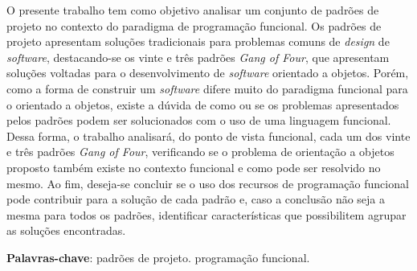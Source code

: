 \setlength{\absparsep}{18pt} %
\begin{resumo}
  O presente trabalho tem como objetivo analisar 
  um conjunto de padrões de projeto no contexto do 
  paradigma de programação funcional. Os padrões 
  de projeto apresentam soluções tradicionais para problemas 
  comuns de \textit{design} de \textit{software}, 
  destacando-se os vinte e três padrões 
  \textit{Gang of Four}, que apresentam soluções 
  voltadas para o desenvolvimento de \textit{software} 
  orientado a objetos. Porém, como a forma 
  de construir um \textit{software} difere muito 
  do paradigma funcional para o orientado a 
  objetos, existe a dúvida de como ou se os 
  problemas apresentados pelos padrões podem ser 
  solucionados com o uso de uma linguagem 
  funcional. Dessa forma, o trabalho analisará, 
  do ponto de vista funcional, cada um dos 
  vinte e três padrões \textit{Gang of Four}, 
  verificando se o problema de orientação a objetos 
  proposto também existe no contexto funcional e 
  como pode ser resolvido no mesmo. Ao 
  fim, deseja-se concluir se o uso dos recursos de 
  programação funcional pode contribuir para a 
  solução de cada padrão e, caso a conclusão não 
  seja a mesma para todos os padrões, 
  identificar características que possibilitem 
  agrupar as soluções encontradas.

 \textbf{Palavras-chave}: padrões de projeto. programação funcional.
\end{resumo}

\begin{comment}
  O presente trabalho tem como objetivo analisar 
  o conceito de padrões de projeto no contexto do 
  paradigma de programação funcional. Os padrões 
  de projeto apresentam soluções comuns para problemas 
  comuns de design de software, destacando-se os 
  vinte e três padrões Gang of Four, que apresentam 
  soluções comuns para problemas relacionados ao 
  paradigma orientado a objetos. Porém, como a forma 
  de construir um software difere muito do paradigma 
  funcional para o orientado a 
  objetos, existe a dúvida de como ou se esses padrões 
  podem ser reaproveitados, além da possibilidade de o 
  uso do paradigma funcional solucionar os problemas 
  oriundos da orientação a objetos.
  Dessa forma, o trabalho buscará analisar, 
  do ponto de vista funcional, cada um dos 
  23 padrões GoF, verificando se o problema de 
  orientação a objetos proposto também existe 
  no contexto funcional e se é resolvido pelo 
  padrão em questão. Também serão analisados, se 
  existirem, os casos em que o problema deixa de 
  existir ou é solucionado de outra forma. Ao 
  fim, deseja-se concluir se 
  o uso dos recursos de programação funcional 
  contribui para a solução de cada padrão GoF 
  e, caso a conclusão não seja a mesma para 
  todos os padrões, tentar identificar as 
  características de cada grupo.


 \textbf{Palavras-chave}: padrões de projeto. programação funcional.
\end{comment}

